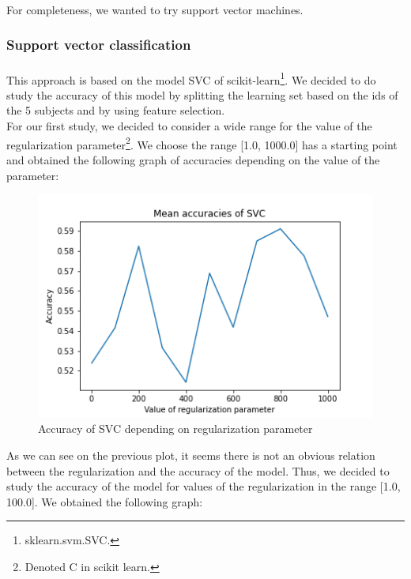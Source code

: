 \documentclass[a4paper, 11pt, oneside]{article}
\begin{document}
\paragraph{}For completeness, we wanted to try support vector machines.

\subsubsection{Support vector classification}
\paragraph{}This approach is based on the model SVC of scikit-learn\footnote{sklearn.svm.SVC.}. We decided to do study the accuracy of this model by splitting the learning set based on the ids of the 5 subjects and by using feature selection.\\
For our first study, we decided to consider a wide range for the value of the regularization parameter\footnote{Denoted C in scikit learn.}. We choose the range [1.0, 1000.0] has a starting point and obtained the following graph of accuracies depending on the value of the parameter:
\begin{figure}[H]
\centering
\includegraphics[scale=0.4]{svm/svm_svc_accuracies_1.png}
\caption{Accuracy of SVC depending on regularization parameter}
\end{figure}
As we can see on the previous plot, it seems there is not an obvious relation between the regularization and the accuracy of the model. Thus, we decided to study the accuracy of the model for values of the regularization in the range [1.0, 100.0]. We obtained the following graph:\newpage
\end{document}
